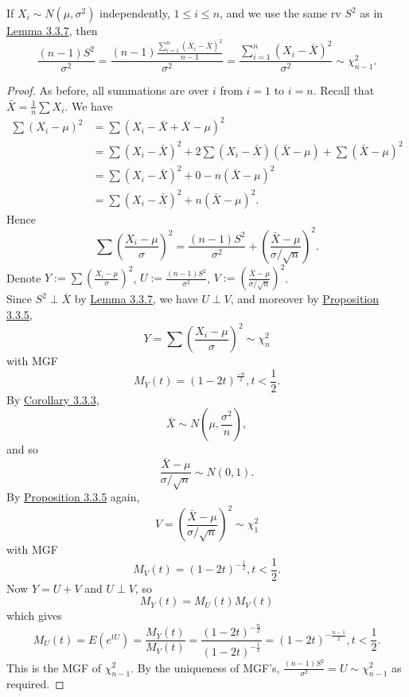 \documentclass[11pt,fleqn]{book} %
\begin{document}
\begin{proposition} \label{prop:338}
If \(X_i \sim N(\mu, \sigma^2)\) independently, \(1 \leq i \leq n\), and we use the same rv \(S^2\) as in \hyperref[lemma:337]{Lemma 3.3.7}, then
\[
\frac{(n-1)S^2}{\sigma^2} = \frac{(n-1)\frac{\sum_{i=1}^n(X_i - \bar{X})^2}{n-1}}{\sigma^2} = \frac{\sum_{i=1}^n(X_i - \bar{X})^2}{\sigma^2} \sim \chi^2_{n-1}.
\]
\end{proposition}
\begin{proof} As before, all summations are over \(i\) from \(i = 1\) to \(i = n\). Recall that \(\bar{X} = \frac1n\sum X_i\). We have
\[
\begin{aligned}
\sum(X_i - \mu)^2 &= \sum(X_i - \bar{X} + \bar{X} - \mu)^2 \\
&= \sum(X_i - \bar{X})^2 + 2\sum(X_i - \bar{X})(\bar{X} - \mu) + \sum(\bar{X} - \mu)^2 \\
&= \sum(X_i - \bar{X})^2 + 0 - n(\bar{X} - \mu)^2 \\
&= \sum(X_i - \bar{X})^2 + n(\bar{X} - \mu)^2.
\end{aligned}
\]
\indent Hence
\[
\sum\left(\frac{X_i - \mu}{\sigma}\right)^2 = \frac{(n-1)S^2}{\sigma^2} + \left(\frac{\bar{X} - \mu}{\sigma / \sqrt{n}}\right)^2.
\]
\indent Denote \(Y := \sum\left(\frac{X_i - \mu}{\sigma}\right)^2\), \(U := \frac{(n - 1)S^2}{\sigma^2}\), \(V := \left(\frac{\bar{X} - \mu}{\sigma / \sqrt{n}}\right)^2\). \\
\indent Since \(S^2 \perp \bar{X}\) by \hyperref[lemma:337]{Lemma 3.3.7}, we have \(U \perp V\), and moreover by \hyperref[prop:335]{Proposition 3.3.5}, 
\[
Y = \sum\left(\frac{X_i - \mu}{\sigma}\right)^2 \sim \chi^2_n
\]
with MGF
\[
M_Y(t) = (1 - 2t)^{\frac{-n}{2}}, t < \frac12.
\]
\indent By \hyperref[cor:333]{Corollary 3.3.3}, 
\[
\bar{X} \sim N\left(\mu, \frac{\sigma^2}{n}\right),
\]
and so
\[
\frac{\bar{X} - \mu}{\sigma / \sqrt{n}} \sim N(0, 1).
\]
\indent By \hyperref[prop:335]{Proposition 3.3.5} again, 
\[
V = \left(\frac{\bar{X} - \mu}{\sigma / \sqrt{n}}\right)^2 \sim \chi_1^2
\]
with MGF
\[
M_V(t) = (1 - 2t)^{-\frac12}, t < \frac12.
\]
\indent Now \(Y = U + V\) and \(U \perp V\), so
\[
M_Y(t) = M_U(t)M_V(t)
\]
which gives
\[
M_U(t) = E(e^{tU}) = \frac{M_Y(t)}{M_V(t)} = \frac{(1 - 2t)^{-\frac{n}{2}}}{(1 - 2t)^{-\frac12}} = (1 - 2t)^{-\frac{n-1}{2}}, t < \frac12.
\]
\indent This is the MGF of \(\chi^2_{n-1}\). By the uniqueness of MGF's, \(\frac{(n-1)S^2}{\sigma^2} = U \sim \chi^2_{n-1}\) as required. 
\end{proof}
\end{document}

